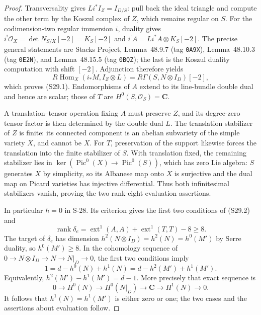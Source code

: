\documentclass[11pt,a4paper]{article}
\theoremstyle{definition}
\begin{document}
\begin{proof}
Transversality gives
$Li^*I_Z=I_{D/S}$: pull back the ideal triangle and
compute the other term by the Koszul complex of $Z$,
which remains regular on $S$.
For the codimension-two regular immersion $i$, duality
gives $i^!\mathcal O_X=\det N_{S/X}[-2]=K_S[-2]$ and
$i^!A=Li^*A\otimes K_S[-2]$.
The precise general statements are Stacks Project,
Lemma~48.9.7 (tag \texttt{0A9X}),
Lemma~48.10.3 (tag \texttt{0E2N}), and
Lemma~48.15.5 (tag \texttt{0BQZ}); the last is the
Koszul duality computation with shift $[-2]$.
Adjunction therefore yields
\[
 R\operatorname{Hom}_X(i_*M,I_Z\otimes L)
     =R\Gamma(S,N\otimes I_D)[-2],
 \tag{S29.4}
\]
which proves (S29.1).
Endomorphisms of $A$ extend to its line-bundle double
dual and hence are scalar; those of $T$ are
$H^0(S,\mathcal O_S)=\mathbf C$.

A translation--tensor operation fixing $A$ must preserve
$Z$, and its degree-zero tensor factor is then determined
by the double dual $L$. The translation stabilizer of
$Z$ is finite: its connected component is an abelian
subvariety of the simple variety $X$, and cannot be $X$.
For $T$, preservation of the support likewise forces the
translation into the finite stabilizer of $S$. With
translation fixed, the remaining stabilizer lies in
$\ker(\operatorname{Pic}^0(X)\to\operatorname{Pic}^0(S))$,
which has zero Lie algebra: $S$ generates $X$ by simplicity,
so its Albanese map onto $X$ is surjective and the dual
map on Picard varieties has injective differential.
Thus both infinitesimal stabilizers vanish, proving the
two rank-eight evaluation assertions.

In particular $h=0$ in S-28. Its criterion gives the
first two conditions of (S29.2) and
\[
 \operatorname{rank}\delta_e
   =\operatorname{ext}^1(A,A)+\operatorname{ext}^1(T,T)-8
   \ge8.
\]
The target of $\delta_e$ has dimension
$h^2(N\otimes I_D)=h^2(N)=h^0(M')$ by Serre duality,
so $h^0(M')\ge8$.
In the cohomology sequence of
$0\to N\otimes I_D\to N\to N|_D\to0$, the first two
conditions imply
\[
 1=d-h^0(N)+h^1(N)
   =d-h^2(M')+h^1(M').
\]
Equivalently, $h^2(M')-h^1(M')=d-1$.
More precisely that exact sequence is
\[
 0\longrightarrow H^0(N)\longrightarrow H^0(N|_D)
 \longrightarrow \mathbf C\longrightarrow H^1(N)
 \longrightarrow0.
 \tag{S29.5}
\]
It follows that $h^1(N)=h^1(M')$ is either zero or one;
the two cases and the assertions about evaluation follow.


\end{proof}
\end{document}
